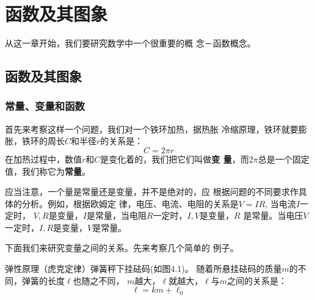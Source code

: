 \chapter{函数及其图象}

从这一章开始，我们要研究数学中一个很重要的概
念－函数概念。
\section{函数及其图象}
\subsection{常量、变量和函数}
首先来考察这样一个问题，我们对一个铁环加热，据热胀
冷缩原理，铁环就要膨胀，铁环的周长$C$和半径$r$的关系是：
\[C=2\pi r\]
在加热过程中，数值$r$和$C$是变化着的，我们把它们叫做\textbf{变
量}，而$2\pi$总是一个固定值，我们称它为\textbf{常量}。

应当注意，一个量是常量还是变量，并不是绝对的，应
根据问题的不同要求作具体的分析。例如，根据欧姆定
律，电压、电流、电阻的关系是$V=IR$, 当电流$I$一定时，
$V,R$是变量，$I$是常量，当电阻$R$一定时，$I,V$是变量，$R$
是常量。当电压$V$一定时，$I,R$是变量，$V$是常量。

下面我们来研究变量之间的关系。先来考察几个简单的
例子。


\begin{example}
    弹性原理（虎克定律）弹簧秤下挂砝码(如图4.1)。
随着所悬挂砝码的质量$m$的不同，弹簧的长度$\ell$也随之不同，
$m$越大，$\ell$就越大，$\ell$与$m$之间的关系是：
\[\ell=km+\ell_0\]
\end{example}

\begin{figure}[htp]
    \centering
 \caption{}
\end{figure}

